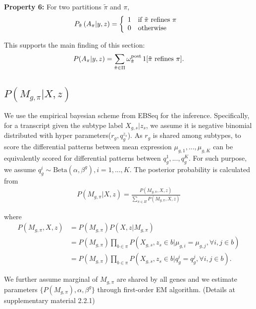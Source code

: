 \documentclass[aoas,preprint]{imsart}
\begin{document}
\noindent
{\bf Property 6:} For two partitions $\tilde \pi$ and $\pi$,  
\begin{eqnarray*}
P_{\tilde \pi}\left( A_{\pi} | y,z \right) = \left\{  \begin{array}{ll}
     1  & {\mbox {\rm if $\tilde \pi$ refines $\pi$ }} \\ 
     0  & {\mbox {\rm otherwise }} \\ 
                                                   \end{array}
   \right.
\end{eqnarray*}


This supports the main finding of this section:
\begin{eqnarray}
\label{eq:mainfinding}
P(A_\pi|y,z) = 
\sum_{\tilde \pi \in \Pi} \omega^{\rm post}_{\tilde \pi} \,  1[ {\mbox {\rm $\tilde \pi$ refines $\pi$}} ].
\end{eqnarray}


\subsection{$P(M_{g,\pi}|X,z)$}
We use the empirical bayesian scheme from EBSeq \citep{ref:Leng} for the inference. Specifically, for a transcript given the subtype label $X_{g,s} | z_s$, we assume it is negative binomial distributed with hyper parameters($r_g, q_g^{z_s}$). As $r_g$ is shared among subtypes, to score the differential patterns between mean expression $\mu_{g,1},...,\mu_{g,K}$ can be equivalently scored for differential patterns between $q_g^1,...,q_g^K$. For such purpose, we assume $q_g^i \sim \text{Beta}(\alpha, \beta^g), i = 1,...,K$. 
The posterior probability is calculated from
\begin{eqnarray*}
P(M_{g,\pi}|X,z) = \frac{ P(M_{g,\pi}, X,z)}{\sum_{\pi \in \Pi} P(M_{g,\pi}, X,z)}
\end{eqnarray*}

where 
\begin{align*}
P(M_{g,\pi}, X,z) &= P(M_{g,\pi})P(X,z | M_{g,\pi})\\
&= P(M_{g,\pi})\underset{b\in\pi}{\prod} P(X_{g,s}, z_s \in b | \mu_{g,i} = \mu_{g,j}, \forall i,j \in b)\\
&= P(M_{g,\pi})\underset{b\in\pi}{\prod} P(X_{g,s}, z_s \in b | q_g^i = q_g^j, \forall i,j \in b).
\end{align*}

We further assume marginal of $M_{g,\pi}$ are shared by all genes and we estimate parameters $\{P(M_{g,\pi}), \alpha, \beta^g\}$ through first-order EM algorithm. (Details at supplementary material 2.2.1)
 
\end{document}
